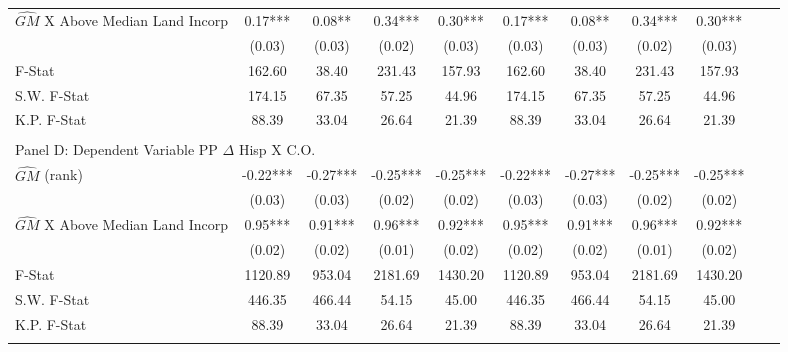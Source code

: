 \begin{table}[htbp]
\begin{threeparttable}
\begin{tabular}{l*{10}{c}}
\addlinespace
$\hat{GM}$ X Above Median Land Incorp&       0.17***&       0.08** &       0.34***&       0.30***&       0.17***&       0.08** &       0.34***&       0.30***\\
                &     (0.03)   &     (0.03)   &     (0.02)   &     (0.03)   &     (0.03)   &     (0.03)   &     (0.02)   &     (0.03)   \\
\midrule
F-Stat          &     162.60   &      38.40   &     231.43   &     157.93   &     162.60   &      38.40   &     231.43   &     157.93   \\
S.W. F-Stat     &     174.15   &      67.35   &      57.25   &      44.96   &     174.15   &      67.35   &      57.25   &      44.96   \\
K.P. F-Stat     &      88.39   &      33.04   &      26.64   &      21.39   &      88.39   &      33.04   &      26.64   &      21.39   \\
\cmidrule[\heavyrulewidth](lr){1-9} \\ \cmidrule[\heavyrulewidth](lr){1-9}
\multicolumn{8}{l}{Panel D: Dependent Variable PP $\Delta$ Hisp X C.O.}\\
\cmidrule(lr){1-9}
$\hat{GM}$ (rank)&      -0.22***&      -0.27***&      -0.25***&      -0.25***&      -0.22***&      -0.27***&      -0.25***&      -0.25***\\
                &     (0.03)   &     (0.03)   &     (0.02)   &     (0.02)   &     (0.03)   &     (0.03)   &     (0.02)   &     (0.02)   \\
\addlinespace
$\hat{GM}$ X Above Median Land Incorp&       0.95***&       0.91***&       0.96***&       0.92***&       0.95***&       0.91***&       0.96***&       0.92***\\
                &     (0.02)   &     (0.02)   &     (0.01)   &     (0.02)   &     (0.02)   &     (0.02)   &     (0.01)   &     (0.02)   \\
\midrule
F-Stat          &    1120.89   &     953.04   &    2181.69   &    1430.20   &    1120.89   &     953.04   &    2181.69   &    1430.20   \\
S.W. F-Stat     &     446.35   &     466.44   &      54.15   &      45.00   &     446.35   &     466.44   &      54.15   &      45.00   \\
K.P. F-Stat     &      88.39   &      33.04   &      26.64   &      21.39   &      88.39   &      33.04   &      26.64   &      21.39   \\
\cmidrule[\heavyrulewidth](lr){1-9} \\ \cmidrule[\heavyrulewidth](lr){1-9}

\end{tabular}
\end{threeparttable}
\end{table}
